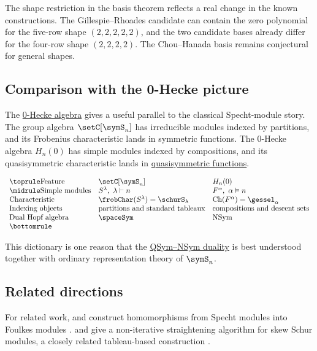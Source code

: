 The shape restriction in the basis theorem reflects a real change in the
known constructions.  The Gillespie--Rhoades candidate can contain the zero
polynomial for the five-row shape $(2,2,2,2,2)$, and the two candidate bases
already differ for the four-row shape $(2,2,2,2)$.  The Chou--Hanada basis
remains conjectural for general shapes.

\subsection[spechtZeroHeckeComparison]{Comparison with the 0-Hecke picture}

The \hyperref[zeroHeckeAlgebra]{0-Hecke algebra} gives a useful parallel to
the classical Specht-module story.  The group algebra $\setC[\symS_n]$ has
irreducible modules indexed by partitions, and its Frobenius characteristic
lands in symmetric functions.  The 0-Hecke algebra $H_n(0)$ has simple
modules indexed by compositions, and its quasisymmetric characteristic lands
in \hyperref[quasiSymmetricFunctions]{quasisymmetric functions}.

\[
\begin{array}{lll}
\toprule
\text{Feature} & \setC[\symS_n] & H_n(0)\\
\midrule
\text{Simple modules} & S^\lambda,\ \lambda\vdash n
  & F^\alpha,\ \alpha\vDash n\\
\text{Characteristic} & \frobChar(S^\lambda)=\schurS_\lambda
  & \mathrm{Ch}(F^\alpha)=\gessel_\alpha\\
\text{Indexing objects} & \text{partitions and standard tableaux}
  & \text{compositions and descent sets}\\
\text{Dual Hopf algebra} & \spaceSym & \mathrm{NSym}\\
\bottomrule
\end{array}
\]

This dictionary is one reason that the
\hyperref[qsymNSymDuality]{QSym--NSym duality} is best understood together
with ordinary representation theory of $\symS_n$.

\subsection[spechtRecentWork]{Related directions}

For related work,  and  construct
homomorphisms from Specht modules into Foulkes modules \cite{PagetWildon2011}.
 and  give a non-iterative
straightening algorithm for skew Schur modules, a closely related
tableau-based construction \cite{HodgesYin2025x}.


